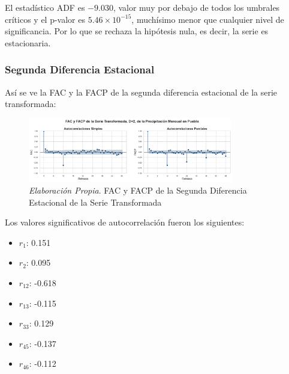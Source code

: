 \documentclass[12pt,letterpaper]{article}   %
\begin{document}
El estadístico ADF es $-9.030$, valor muy por debajo de todos los umbrales críticos y el p-valor es $5.46 \times 10^{-15}$, muchísimo menor que cualquier nivel de significancia. Por lo que se rechaza la hipótesis nula, es decir, la serie es estacionaria.


















  \subsubsection{Segunda Diferencia Estacional}

Así se ve la FAC y la FACP de la segunda diferencia estacional de la serie transformada:
  \begin{figure}[ht]
    \centering
    \includegraphics[width=0.8\textwidth]{imagenes/03-11-fac-facp-serie-D2.pdf}
    \caption{\textit{Elaboración Propia}. FAC y FACP de la Segunda Diferencia Estacional de la Serie Transformada}
\end{figure}


Los valores significativos de autocorrelación fueron los siguientes:
\begin{multicols}{5}
\scriptsize
\begin{itemize}
    \item $r_1$: 0.151
    \item $r_2$: 0.095
    \item $r_{12}$: -0.618
    \item $r_{13}$: -0.115
    \item $r_{33}$: 0.129
    \item $r_{45}$: -0.137
    \item $r_{46}$: -0.112
\end{itemize}
\end{multicols}
\end{document}
